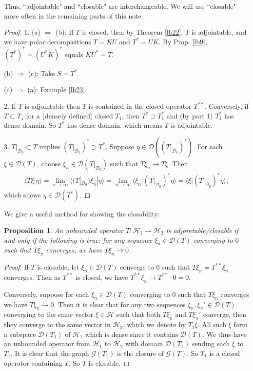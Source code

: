 \documentclass[12pt,b5paper,notitlepage]{article}
\theoremstyle{definition}
\theoremstyle{plain}
\newtheorem{pp}[df]{Proposition}
\newcommand{\mc}{\mathcal}
\newcommand{\Dom}{\scr D}
\newcommand{\bk}[1]{\langle {#1}\rangle}
\newcommand{\scr}{\mathscr}
\numberwithin{equation}{section}
\begin{document}
Thus, ``adjointable" and ``closable" are interchangeable. We will use ``closable" more often in the remaining parts of this note.


\begin{proof}
1. (a) $\Rightarrow$ (b): If $T$ is closed, then by Theorem \ref{lb22}, $T$ is adjointable, and we have polar decompisitions $T=KU$ and $T^*=UK$. By Prop. \ref{lb9}, $(T^*)^*=(U^*K)^*$ equals $KU^*=T$.

(b) $\Rightarrow$ (c):  Take $S=T^*$.

(c) $\Rightarrow$ (a): Example \ref{lb23}.

2. If $T$ is adjointable then $T$ is contained in the closed operator $T^{**}$. Conversely, if $T\subset T_1$ for a (densely defined) closed $T_1$, then $T^*\supset T_1^*$ and (by part 1) $T_1^*$ has dense domain. So $T^*$ has dense domain, which means $T$ is adjointable. 

3. $T|_{\Dom_0}\subset T$ implies $(T|_{\Dom_0})^*\supset T^*$. Suppose $\eta\in\Dom((T|_{\Dom_0})^*)$. For each $\xi\in\Dom(T)$, choose $\xi_n\in\Dom(T|_{\Dom_0})$ such that $T\xi_n\rightarrow T\xi$. Then
\begin{align*}
\bk{T\xi|\eta}=\lim_{n\rightarrow\infty}\bk{(T|_{\Dom_0})\xi_n|\eta}=\lim_{n\rightarrow\infty}\bk{\xi_n|(T|_{\Dom_0})^*\eta}=\bk{\xi|(T|_{\Dom_0})^*\eta},	
\end{align*}
which shows $\eta\in\Dom(T^*)$.
\end{proof}


We give a useful method for showing the closability:

\begin{pp}
An unbounded operator $T:\mc H_1\rightarrow\mc H_2$  is adjointable/closable if and only if the following is true: for any sequence $\xi_n\in\Dom(T)$ converging to $0$ such that $T\xi_n$ converges, we have $T\xi_n\rightarrow 0$.
\end{pp}


\begin{proof}
If $T$ is closable, let $\xi_n\in\Dom(T)$ converge to $0$ such that $T\xi_n=T^{**}\xi_n$ converges. Then as $T^{**}$ is closed, we have  $T^{**}\xi_n\rightarrow T^{**}\cdot 0=0$.

Conversely, suppose for each $\xi_n\in\Dom(T)$ converging to $0$ such that $T\xi_n$ converges we have $T\xi_n\rightarrow 0$. Then it is clear that for any  two sequences $\xi_n,\xi_n'\in\Dom(T)$ converging to the same vector $\xi\in\mc H$ such that both $T\xi_n$ and $T\xi_n'$ converge, then they converge to the same vector in $\mc H_2$, which we denote by $T_1\xi$. All such $\xi$ form a subspace $\Dom(T_1)$ of $\mc H_1$ which is dense since it contains $\Dom(T)$. We thus have an unbounded operator from $\mc H_1$ to $\mc H_2$ with domain $\Dom(T_1)$ sending each $\xi$ to $T_1$. It is clear that the graph $\scr G(T_1)$ is the closure of  $\scr G(T)$. So $T_1$ is a closed operator containing $T$. So $T$ is closable.  
\end{proof}
\end{document}
